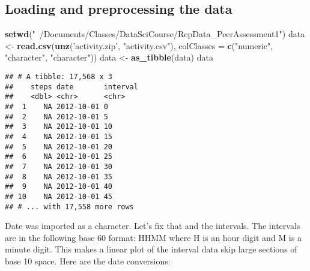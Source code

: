 \documentclass[]{article}
\newenvironment{Shaded}{\begin{snugshade}}{\end{snugshade}}
\newcommand{\KeywordTok}[1]{\textcolor[rgb]{0.13,0.29,0.53}{\textbf{#1}}}
\newcommand{\DataTypeTok}[1]{\textcolor[rgb]{0.13,0.29,0.53}{#1}}
\newcommand{\StringTok}[1]{\textcolor[rgb]{0.31,0.60,0.02}{#1}}
\newcommand{\NormalTok}[1]{#1}
\begin{document}
\subsection{Loading and preprocessing the
data}\label{loading-and-preprocessing-the-data}

\begin{Shaded}
\begin{Highlighting}[]
\KeywordTok{setwd}\NormalTok{(}\StringTok{"~/Documents/Classes/DataSciCourse/RepData_PeerAssessment1"}\NormalTok{)}
\NormalTok{data <-}\StringTok{ }\KeywordTok{read.csv}\NormalTok{(}\KeywordTok{unz}\NormalTok{(}\StringTok{'activity.zip'}\NormalTok{, }\StringTok{"activity.csv"}\NormalTok{), }\DataTypeTok{colClasses =} \KeywordTok{c}\NormalTok{(}\StringTok{"numeric"}\NormalTok{, }
                                                \StringTok{"character"}\NormalTok{, }\StringTok{"character"}\NormalTok{))}
\NormalTok{data <-}\StringTok{ }\KeywordTok{as_tibble}\NormalTok{(data)}
\NormalTok{data}
\end{Highlighting}
\end{Shaded}

\begin{verbatim}
## # A tibble: 17,568 x 3
##    steps date       interval
##    <dbl> <chr>      <chr>   
##  1    NA 2012-10-01 0       
##  2    NA 2012-10-01 5       
##  3    NA 2012-10-01 10      
##  4    NA 2012-10-01 15      
##  5    NA 2012-10-01 20      
##  6    NA 2012-10-01 25      
##  7    NA 2012-10-01 30      
##  8    NA 2012-10-01 35      
##  9    NA 2012-10-01 40      
## 10    NA 2012-10-01 45      
## # ... with 17,558 more rows
\end{verbatim}

Date was imported as a character. Let's fix that and the intervals. The
intervals are in the following base 60 format: HHMM where H is an hour
digit and M is a minute digit. This makes a linear plot of the interval
data skip large sections of base 10 space. Here are the date
conversions:
\end{document}
